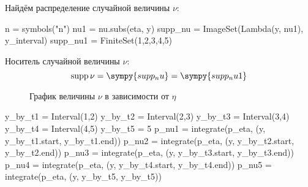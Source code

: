 
Найдём распределение случайной величины $\nu$:

\begin{sympycode}
n = symbols("n")
nu1 = nu.subs(eta, y)
supp_nu = ImageSet(Lambda(y, nu1), y_interval)
supp_nu1 = FiniteSet(1,2,3,4,5)
\end{sympycode}

Носитель случайной величины $\nu$:
\[
    \supp \nu = \sympy{supp_nu} = \sympy{supp_nu1}
\]

\begin{figure}[h!]
    \centering
    \caption{График величины $\nu$ в зависимости от $\eta$}
    \label{fig:nu}
\end{figure}

\begin{sympycode}
y_by_t1 = Interval(1,2)
y_by_t2 = Interval(2,3)
y_by_t3 = Interval(3,4)
y_by_t4 = Interval(4,5)
y_by_t5 = 5
p_nu1 = integrate(p_eta, (y, y_by_t1.start, y_by_t1.end))
p_nu2 = integrate(p_eta, (y, y_by_t2.start, y_by_t2.end))
p_nu3 = integrate(p_eta, (y, y_by_t3.start, y_by_t3.end))
p_nu4 = integrate(p_eta, (y, y_by_t4.start, y_by_t4.end))
p_nu5 = integrate(p_eta, (y, y_by_t5, y_by_t5))
\end{sympycode}

